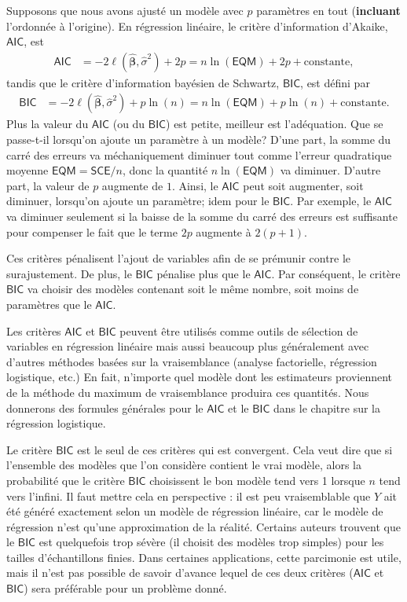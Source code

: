 \documentclass[
  11pt,
  letterpaper,
]{book}
\theoremstyle{definition}
\theoremstyle{remark}
\begin{document}
Supposons que nous avons ajusté un modèle avec \(p\) paramètres en tout
(\textbf{incluant} l'ordonnée à l'origine). En régression linéaire, le
critère d'information d'Akaike, \(\mathsf{AIC}\), est \begin{align*}
\mathsf{AIC} &=-2 \ell(\widehat{\boldsymbol{\beta}}, \widehat{\sigma}^2) +2p = n \ln (\mathsf{EQM}) + 2p + \text{constante},
\end{align*} tandis que le critère d'information bayésien de Schwartz,
\(\mathsf{BIC}\), est défini par \begin{align*}
\mathsf{BIC} &=-2 \ell(\widehat{\boldsymbol{\beta}}, \widehat{\sigma}^2) + p\ln(n)=n \ln (\mathsf{EQM}) + p\ln(n) + \text{constante}.
\end{align*} Plus la valeur du \(\mathsf{AIC}\) (ou du \(\mathsf{BIC}\))
est petite, meilleur est l'adéquation. Que se passe-t-il lorsqu'on
ajoute un paramètre à un modèle? D'une part, la somme du carré des
erreurs va méchaniquement diminuer tout comme l'erreur quadratique
moyenne \(\textsf{EQM} = \textsf{SCE}/n\), donc la quantité
\(n \ln (\mathsf{EQM})\) va diminuer. D'autre part, la valeur de \(p\)
augmente de \(1\). Ainsi, le \(\mathsf{AIC}\) peut soit augmenter, soit
diminuer, lorsqu'on ajoute un paramètre; idem pour le \(\mathsf{BIC}\).
Par exemple, le \(\mathsf{AIC}\) va diminuer seulement si la baisse de
la somme du carré des erreurs est suffisante pour compenser le fait que
le terme \(2p\) augmente à \(2 (p+1)\).

Ces critères pénalisent l'ajout de variables afin de se prémunir contre
le surajustement. De plus, le \(\mathsf{BIC}\) pénalise plus que le
\(\mathsf{AIC}\). Par conséquent, le critère \(\mathsf{BIC}\) va choisir
des modèles contenant soit le même nombre, soit moins de paramètres que
le \(\mathsf{AIC}\).

Les critères \(\mathsf{AIC}\) et \(\mathsf{BIC}\) peuvent être utilisés
comme outils de sélection de variables en régression linéaire mais aussi
beaucoup plus généralement avec d'autres méthodes basées sur la
vraisemblance (analyse factorielle, régression logistique, etc.) En
fait, n'importe quel modèle dont les estimateurs proviennent de la
méthode du maximum de vraisemblance produira ces quantités. Nous
donnerons des formules générales pour le \(\mathsf{AIC}\) et le
\(\mathsf{BIC}\) dans le chapitre sur la régression logistique.

Le critère \(\mathsf{BIC}\) est le seul de ces critères qui est
convergent. Cela veut dire que si l'ensemble des modèles que l'on
considère contient le vrai modèle, alors la probabilité que le critère
\(\mathsf{BIC}\) choisissent le bon modèle tend vers 1 lorsque \(n\)
tend vers l'infini. Il faut mettre cela en perspective : il est peu
vraisemblable que \(Y\) ait été généré exactement selon un modèle de
régression linéaire, car le modèle de régression n'est qu'une
approximation de la réalité. Certains auteurs trouvent que le
\(\mathsf{BIC}\) est quelquefois trop sévère (il choisit des modèles
trop simples) pour les tailles d'échantillons finies. Dans certaines
applications, cette parcimonie est utile, mais il n'est pas possible de
savoir d'avance lequel de ces deux critères (\(\mathsf{AIC}\) et
\(\mathsf{BIC}\)) sera préférable pour un problème donné.
\end{document}
